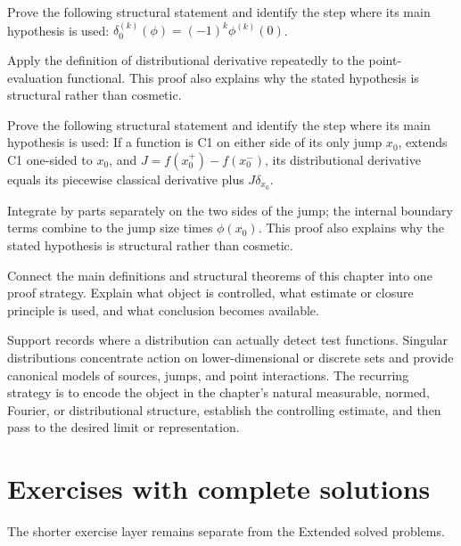 \begin{problem}\label{prob:iii17-problem-10}
Prove the following structural statement and identify the step where its main hypothesis is used: $\delta_0^{(k)}(\phi)=(-1)^k\phi^{(k)}(0)$.
\end{problem}
\begin{solution}
Apply the definition of distributional derivative repeatedly to the point-evaluation functional. This proof also explains why the stated hypothesis is structural rather than cosmetic.
\end{solution}

\begin{problem}\label{prob:iii17-problem-11}
Prove the following structural statement and identify the step where its main hypothesis is used: If a function is C1 on either side of its only jump $x_0$, extends C1 one-sided to $x_0$, and $J=f(x_0^+)-f(x_0^-)$, its distributional derivative equals its piecewise classical derivative plus $J\delta_{x_0}$.
\end{problem}
\begin{solution}
Integrate by parts separately on the two sides of the jump; the internal boundary terms combine to the jump size times $\phi(x_0)$. This proof also explains why the stated hypothesis is structural rather than cosmetic.
\end{solution}

\begin{problem}\label{prob:iii17-problem-12}
Connect the main definitions and structural theorems of this chapter into one proof strategy. Explain what object is controlled, what estimate or closure principle is used, and what conclusion becomes available.
\end{problem}
\begin{solution}
Support records where a distribution can actually detect test functions. Singular distributions concentrate action on lower-dimensional or discrete sets and provide canonical models of sources, jumps, and point interactions. The recurring strategy is to encode the object in the chapter's natural measurable, normed, Fourier, or distributional structure, establish the controlling estimate, and then pass to the desired limit or representation.
\end{solution}
\section{Exercises with complete solutions}
The shorter exercise layer remains separate from the Extended solved problems.

